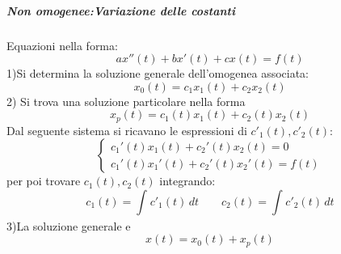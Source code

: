 \documentclass[a4paper, titlepage]{report}%
\theoremstyle{definition} %
\theoremstyle{plain}
\theoremstyle{plain}
\theoremstyle{remark}
\theoremstyle{remark}
\theoremstyle{plain}
\theoremstyle{plain}
\theoremstyle{plain}
\theoremstyle{plain}
\theoremstyle{plain}
\begin{document}
\subparagraph*{Non omogenee:Variazione delle costanti}
Equazioni nella forma:
\[
     ax''(t) + bx'(t) + cx(t)= f(t)
\]
1)Si determina la soluzione generale dell'omogenea associata:
\[
     x_0(t) = c_1 x_1(t) + c_2x_2(t)    
\]
2) Si trova una soluzione particolare nella forma
\[
     x_p(t) = c_1(t) x_1(t) + c_2(t) x_2(t)    
\]
Dal seguente sistema si ricavano le espressioni di $c'_1(t), c'_2(t)$:
\[
   \begin{cases}
    c_1'(t) x_1(t) + c_2'(t) x_2(t) = 0 
    \\
    c_1'(t) x_1'(t) + c_2'(t) x_2'(t) = f(t)
   \end{cases}    
\]
per poi trovare $c_1(t), c_2(t)$ integrando:
\[
    c_1(t) = \int_{}^{} c'_1(t) \, dt \qquad c_2(t) = \int_{}^{} c'_2(t) \,dt
\]
3)La soluzione generale e\'
\[
      x(t)= x_0(t) + x_p(t)    
\]
\end{document}
